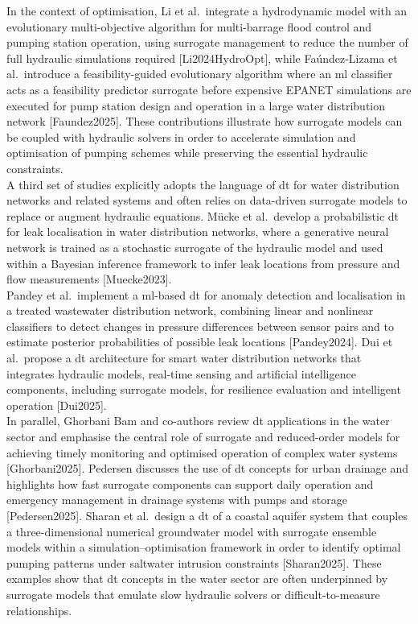 In the context of optimisation, Li et al.\ integrate a hydrodynamic model with an evolutionary multi-objective algorithm for multi-barrage flood control and pumping station operation, using surrogate management to reduce the number of full hydraulic simulations required [Li2024HydroOpt], while Faúndez-Lizama et al.\ introduce a feasibility-guided evolutionary algorithm where an \acrshort{ml} classifier acts as a feasibility predictor surrogate before expensive EPANET simulations are executed for pump station design and operation in a large water distribution network [Faundez2025]. These contributions illustrate how surrogate models can be coupled with hydraulic solvers in order to accelerate simulation and optimisation of pumping schemes while preserving the essential hydraulic constraints.\\

A third set of studies explicitly adopts the language of \acrfull{dt} for water distribution networks and related systems and often relies on data-driven surrogate models to replace or augment hydraulic equations. Mücke et al.\ develop a probabilistic \acrshort{dt} for leak localisation in water distribution networks, where a generative neural network is trained as a stochastic surrogate of the hydraulic model and used within a Bayesian inference framework to infer leak locations from pressure and flow measurements [Muecke2023].\\

Pandey et al.\ implement a \acrshort{ml}-based \acrshort{dt} for anomaly detection and localisation in a treated wastewater distribution network, combining linear and nonlinear classifiers to detect changes in pressure differences between sensor pairs and to estimate posterior probabilities of possible leak locations [Pandey2024]. Dui et al.\ propose a \acrshort{dt} architecture for smart water distribution networks that integrates hydraulic models, real-time sensing and artificial intelligence components, including surrogate models, for resilience evaluation and intelligent operation [Dui2025].\\

In parallel, Ghorbani Bam and co-authors review \acrshort{dt} applications in the water sector and emphasise the central role of surrogate and reduced-order models for achieving timely monitoring and optimised operation of complex water systems [Ghorbani2025]. Pedersen discusses the use of \acrshort{dt} concepts for urban drainage and highlights how fast surrogate components can support daily operation and emergency management in drainage systems with pumps and storage [Pedersen2025]. Sharan et al.\ design a \acrshort{dt} of a coastal aquifer system that couples a three-dimensional numerical groundwater model with surrogate ensemble models within a simulation–optimisation framework in order to identify optimal pumping patterns under saltwater intrusion constraints [Sharan2025]. These examples show that \acrshort{dt} concepts in the water sector are often underpinned by surrogate models that emulate slow hydraulic solvers or difficult-to-measure relationships. \\

